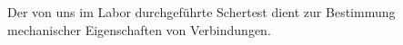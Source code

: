 Der von uns im Labor durchgeführte Schertest dient zur Bestimmung mechanischer Eigenschaften von Verbindungen.